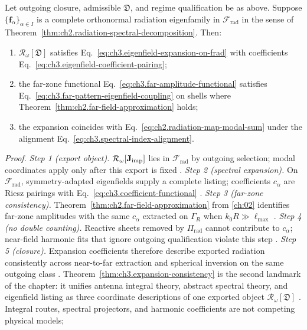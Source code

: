 \begin{theorem}
\label{thm:ch3.expansion-consistency}
Let outgoing closure, admissible \(\mathfrak{D}\), and regime qualification be as above. Suppose
\(\{\mathbf{f}_\alpha\}_{\alpha\in I}\) is a complete orthonormal radiation eigenfamily in
\(\mathcal{F}_{\mathrm{rad}}\) in the sense of Theorem~\ref{thm:ch2.radiation-spectral-decomposition}.
Then:
\begin{enumerate}[label=(\roman*)]
\item \(\mathcal{R}_\omega[\mathfrak{D}]\) satisfies
Eq.~\eqref{eq:ch3.eigenfield-expansion-on-frad} with coefficients
Eq.~\eqref{eq:ch3.eigenfield-coefficient-pairing};
\item the far-zone functional Eq.~\eqref{eq:ch3.far-amplitude-functional} satisfies
Eq.~\eqref{eq:ch3.far-pattern-eigenfield-coupling} on shells where
Theorem~\ref{thm:ch2.far-field-approximation} holds;
\item the expansion coincides with Eq.~\eqref{eq:ch2.radiation-map-modal-sum} under the alignment
Eq.~\eqref{eq:ch3.spectral-index-alignment}.
\end{enumerate}
\end{theorem}
\noindent\textit{Proof.}
\emph{Step 1 (export object).} \(\mathcal{R}_\omega[\mathbf{J}_{\mathrm{imp}}]\) lies in \(\mathcal{F}_{\mathrm{rad}}\) by outgoing selection; modal coordinates apply only after this export is fixed .
\emph{Step 2 (spectral expansion).} On \(\mathcal{F}_{\mathrm{rad}}\), symmetry-adapted eigenfields supply a complete listing; coefficients \(c_\alpha\) are Riesz pairings with Eq.~\eqref{eq:ch3.coefficient-functional} .
\emph{Step 3 (far-zone consistency).} Theorem~\ref{thm:ch2.far-field-approximation} from \ref{ch:02} identifies far-zone amplitudes with the same \(c_\alpha\) extracted on \(\Gamma_R\) when \(k_0R\gg\ell_{\max}\) .
\emph{Step 4 (no double counting).} Reactive sheets removed by \(\Pi_{\mathrm{rad}}\) cannot contribute to \(c_\alpha\); near-field harmonic fits that ignore outgoing qualification violate this step .
\emph{Step 5 (closure).} Expansion coefficients therefore describe exported radiation consistently across near-to-far extraction and spherical inversion on the same outgoing class .
Theorem~\ref{thm:ch3.expansion-consistency} is the second landmark of the chapter: it unifies
antenna integral theory, abstract spectral theory, and eigenfield listing as three coordinate
descriptions of one exported object \(\mathcal{R}_\omega[\mathfrak{D}]\) .
Integral routes, spectral projectors, and harmonic coefficients are not competing physical models;
